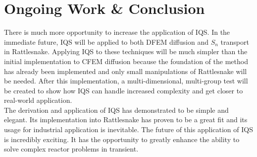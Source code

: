 \documentclass[12pt]{scrartcl}
\begin{document}
\section{Ongoing Work \& Conclusion}
There is much more opportunity to increase the application of IQS.  In the immediate future, IQS will be applied to both DFEM diffusion and $S_n$ transport in Rattlesnake.  Applying IQS to these techniques will be much simpler than the initial implementation to CFEM diffusion because the foundation of the method has already been implemented and only small manipulations of Rattlesnake will be needed.  After this implementation, a multi-dimensional, multi-group test will be created to show how IQS can handle increased complexity and get closer to real-world application.
\\
The derivation and application of IQS has demonstrated to be simple and elegant.  Its implementation into Rattlesnake has proven to be a great fit and its usage for industrial application is inevitable.  The future of this application of IQS is incredibly exciting.  It has the opportunity to greatly enhance the ability to solve complex reactor problems in transient.
\end{document}
